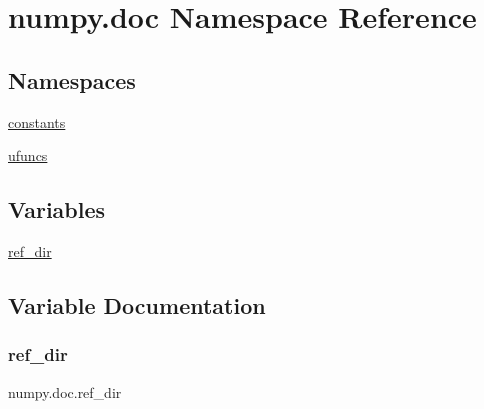 \hypertarget{namespacenumpy_1_1doc}{}\section{numpy.\+doc Namespace Reference}
\label{namespacenumpy_1_1doc}
\subsection*{Namespaces}
\begin{DoxyCompactItemize}
\item 
 \hyperlink{namespacenumpy_1_1doc_1_1constants}{constants}
\item 
 \hyperlink{namespacenumpy_1_1doc_1_1ufuncs}{ufuncs}
\end{DoxyCompactItemize}
\subsection*{Variables}
\begin{DoxyCompactItemize}
\item 
\hyperlink{namespacenumpy_1_1doc_af7cf8e271b3994bd09a814cee01350e7}{ref\+\_\+dir}
\end{DoxyCompactItemize}


\subsection{Variable Documentation}
\mbox{\label{namespacenumpy_1_1doc_af7cf8e271b3994bd09a814cee01350e7}} 
\subsubsection{\texorpdfstring{ref\+\_\+dir}{ref\_dir}}
{\footnotesize\ttfamily numpy.\+doc.\+ref\+\_\+dir}

